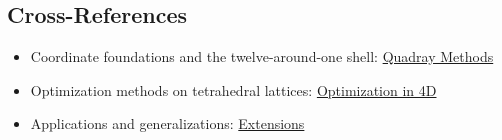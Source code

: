 \documentclass[
  10pt,
]{article}
\providecommand{\tightlist}{%
  \setlength{\itemsep}{0pt}\setlength{\parskip}{0pt}}
\begin{document}
\subsection{Cross-References}\label{cross-references}

\begin{itemize}
\tightlist
\item
  Coordinate foundations and the twelve-around-one shell:
  \href{03_quadray_methods.md}{Quadray Methods}
\item
  Optimization methods on tetrahedral lattices:
  \href{04_optimization_in_4d.md}{Optimization in 4D}
\item
  Applications and generalizations: \href{05_extensions.md}{Extensions}
\end{itemize}
\end{document}
